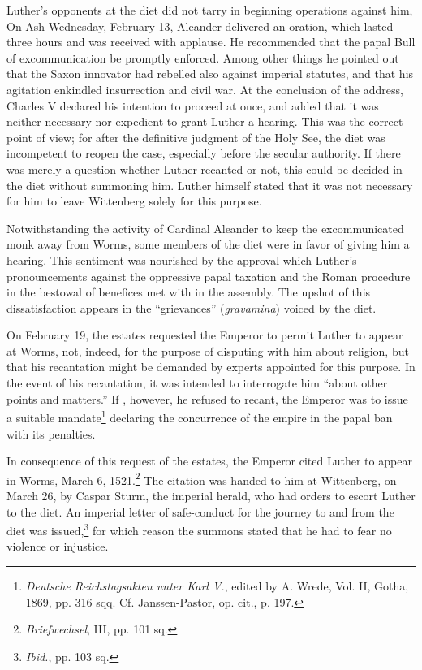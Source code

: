 Luther’s opponents at the diet did not tarry in beginning operations
against him, On Ash-Wednesday, February 13, Aleander delivered an oration,
which lasted three hours and was received with
applause. He recommended that the papal Bull of excommunication
be promptly enforced. Among other things he pointed out that the
Saxon innovator had rebelled also against imperial statutes, and that
his agitation enkindled insurrection and civil war. At the conclusion
of the address, Charles V declared his intention to proceed at once,
and added that it was neither necessary nor expedient to grant Luther
a hearing. This was the correct point of view; for after the definitive
judgment of the Holy See, the diet was incompetent to reopen the
case, especially before the secular authority. If there was merely a
question whether Luther recanted or not, this could be decided in
the diet without summoning him. Luther himself stated that it
was not necessary for him to leave Wittenberg solely for this purpose.

Notwithstanding the activity of Cardinal Aleander to keep the excommunicated
monk away from Worms, some members of the diet
were in favor of giving him a hearing. This sentiment was nourished
by the approval which Luther’s pronouncements against the oppressive papal
taxation and the Roman procedure in the bestowal of benefices met with
in the assembly. The upshot of this dissatisfaction appears in the “grievances”
(\textit{gravamina}) voiced by the diet.

On February 19, the estates requested the Emperor to permit
Luther to appear at Worms, not, indeed, for the purpose of disputing
with him about religion, but that his recantation might be demanded
by experts appointed for this purpose. In the event of his recantation,
it was intended to interrogate him “about other points and matters.” If
, however, he refused to recant, the Emperor was to issue a
suitable mandate\footnote
{\textit{Deutsche Reichstagsakten unter Karl V.}, edited by A. Wrede, Vol. II, Gotha, 1869, pp.
316 sqq. Cf. Janssen-Pastor, op. cit., p. 197.}
declaring the concurrence of the empire in the
papal ban with its penalties.

In consequence of this request of the estates, the Emperor cited
Luther to appear in Worms, March 6, 1521.\footnote{\textit{Briefwechsel}, III, pp. 101 sq.}
The citation was handed
to him at Wittenberg, on March 26, by Caspar Sturm, the imperial
herald, who had orders to escort Luther to the diet. An imperial letter
of safe-conduct for the journey to and from the diet was issued,\footnote{\textit{Ibid.}, pp. 103 sq.}
for which reason the summons stated that he had to fear no violence or
injustice.

